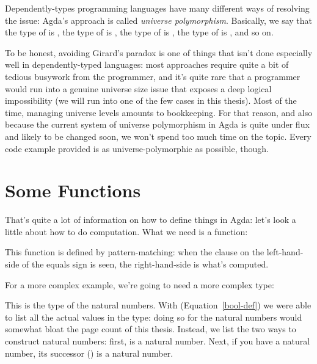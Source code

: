 Dependently-types programming languages have many different ways of resolving
the issue: Agda's approach is called \emph{universe polymorphism}.
Basically, we say that the type of  is
, the type of  is
, the type of 
is , the type of 
is , and so on.

To be honest, avoiding Girard's paradox is one of things that isn't done
especially well in dependently-typed languages: most approaches require quite a
bit of tedious busywork from the programmer, and it's quite rare that a
programmer would run into a genuine universe size issue that exposes a deep
logical impossibility (we will run into one of the few cases in this thesis).
Most of the time, managing universe levels amounts to bookkeeping.
For that reason, and also because the current system of universe polymorphism in
Agda is quite under flux and likely to be changed soon, we won't spend too much
time on the topic.
Every code example provided is as universe-polymorphic as possible, though.
\section{Some Functions}
That's quite a lot of information on how to define things in Agda: let's look a
little about how to do computation.
What we need is a function:
\begin{agdalisting*}
\end{agdalisting*}
This function is defined by pattern-matching: when the clause on the
left-hand-side of the equals sign is seen, the right-hand-side is what's
computed.

For a more complex example, we're going to need a more complex type:
\begin{agdalisting}
\end{agdalisting}
This is the type of the natural numbers.
With  (Equation~\ref{bool-def}) we were able to list all the
actual values in the type: doing so for the natural numbers would somewhat bloat
the page count of this thesis.
Instead, we list the two ways to construct natural numbers: first,
 is a natural number.
Next, if you have a natural number, its successor
() is a natural number.


